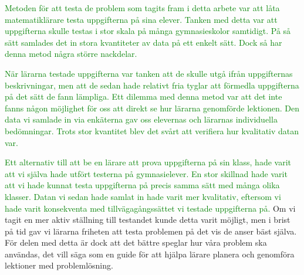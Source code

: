 \textcolor{green}{Metoden för att testa de problem som tagits fram i detta arbete var att låta matematiklärare testa uppgifterna på sina elever. Tanken med detta var att uppgifterna skulle testas i stor skala på många gymnasieskolor samtidigt. På så sätt samlades det in stora kvantiteter av data på ett enkelt sätt. Dock så har denna metod några större nackdelar.}

\textcolor{green}{När lärarna testade uppgifterna var tanken att de skulle utgå ifrån uppgifternas beskrivningar, men att de sedan hade relativt fria tyglar att förmedla uppgifterna på det sätt de fann lämpliga. Ett dilemma med denna metod var att det inte fanns någon möjlighet för oss att direkt se hur lärarna genomförde lektionen. Den data vi samlade in via enkäterna gav oss elevernas och lärarnas individuella bedömningar. Trots stor kvantitet blev det svårt att verifiera hur kvalitativ datan var.}

\textcolor{green}{Ett alternativ till att be en lärare att prova uppgifterna på sin klass, hade varit att vi själva hade utfört testerna på gymnasielever. En stor skillnad hade varit att vi hade kunnat testa uppgifterna på precis samma sätt med många olika klasser. Datan vi sedan hade samlat in hade varit mer kvalitativ, eftersom vi hade varit konsekventa med tillvägagångssättet vi testade uppgifterna på.}
    \textcolor{WildStrawberry}{
    Om vi tagit en mer aktiv ställning till testandet kunde detta varit möjligt, men i brist på tid gav vi lärarna friheten att testa problemen på det vis de anser bäst själva.} \textcolor{lila}{För delen med detta är dock att det bättre speglar hur våra problem ska användas, det vill säga som en guide för att hjälpa lärare  planera och genomföra lektioner med problemlösning.}


%
% 
%
% 
%